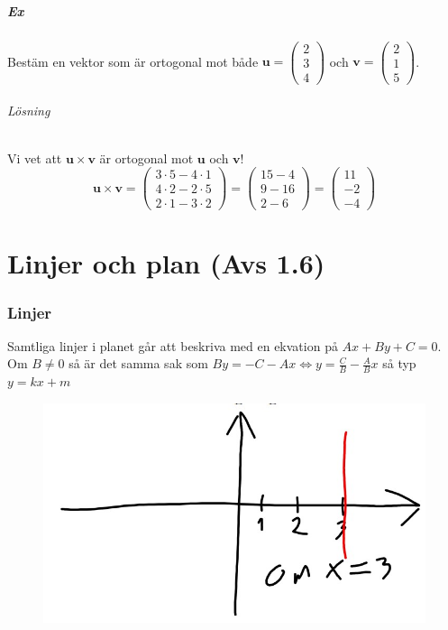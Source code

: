 \paragraph{Ex} Bestäm en vektor som är ortogonal mot både $\bm{u}=\begin{pmatrix}2\\3\\4\end{pmatrix}$ och $\bm{v}=\begin{pmatrix}2\\1\\5\end{pmatrix}$.
\subparagraph{Lösning} Vi vet att $\bm{u}\times \bm{v}$ är ortogonal mot $\bm{u}$ och $\bm{v}$!
\begin{equation*}
    \bm{u}\times \bm{v}=\begin{pmatrix}
        3\cdot 5-4\cdot 1\\
        4\cdot 2 - 2\cdot 5\\
        2\cdot 1 - 3\cdot 2
    \end{pmatrix} = 
    \begin{pmatrix}
        15-4\\
        9-16\\
        2-6
    \end{pmatrix} = \begin{pmatrix}11\\-2\\-4\end{pmatrix}
\end{equation*}

\chapter{Linjer och plan (Avs 1.6)}
\subsection{Linjer}
Samtliga linjer i planet går att beskriva med en ekvation på $Ax+By+C=0$.
Om $B\neq 0$ så är det samma sak som $By=-C-Ax \Leftrightarrow y=\frac{C}{B} - \frac{A}{B}x$ så typ $y=kx+m$

\begin{figure}
    \vspace{-20pt}
    \centering
    \includegraphics[scale=0.25]{imgs/22-01-24img02.jpg}\\
    \vspace{-30pt}
\end{figure}
